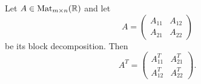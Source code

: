 \begin{property}
    Let $A\in\text{Mat}_{m\times n}(\mathbb{R})$ and let 
    $$A=\left(
      \begin{array}{c|c}
        A_{11} & A_{12} \\ \hline
        A_{21} & A_{22}
      \end{array}
    \right)
    $$
    be its block decomposition. Then 
    $$
    A^T=\left(
      \begin{array}{c|c}
        A_{11}^T & A_{21}^T \\ \hline
        A_{12}^T & A_{22}^T
      \end{array}
    \right).
    $$
\end{property}
